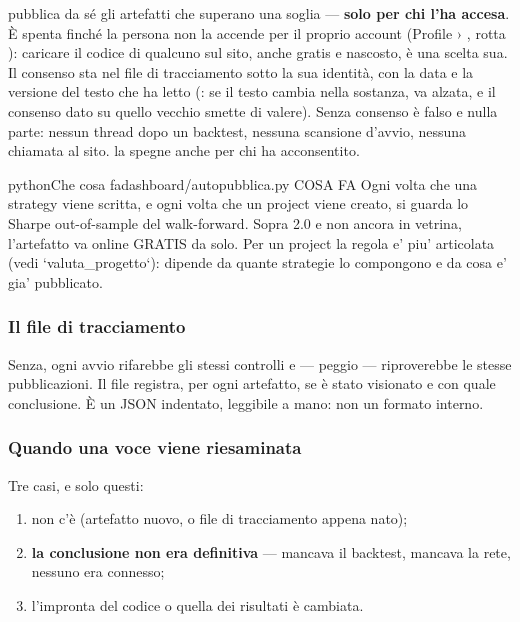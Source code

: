  pubblica da sé gli artefatti che superano
una soglia --- \textbf{solo per chi l'ha accesa}. È spenta finché la persona
non la accende per il proprio account (Profile › , rotta ): caricare il
codice di qualcuno sul sito, anche gratis e nascosto, è una scelta sua. Il
consenso sta nel file di tracciamento sotto la sua identità, con la data e la
versione del testo che ha letto (: se il testo cambia
nella sostanza, va alzata, e il consenso dato su quello vecchio smette di
valere). Senza consenso  è falso e nulla parte:
nessun thread dopo un backtest, nessuna scansione d'avvio, nessuna chiamata
al sito.  la spegne anche per chi ha acconsentito.

\begin{codiceInterno}{python}{Che cosa fa}{dashboard/autopubblica.py}
COSA FA
Ogni volta che una strategy viene scritta, e ogni volta che un project viene
creato, si guarda lo Sharpe out-of-sample del walk-forward. Sopra 2.0 e non
ancora in vetrina, l'artefatto va online GRATIS da solo. Per un project la
regola e' piu' articolata (vedi `valuta_progetto`): dipende da quante strategie
lo compongono e da cosa e' gia' pubblicato.
\end{codiceInterno}

\subsubsection{Il file di tracciamento}

Senza, ogni avvio rifarebbe gli stessi controlli e --- peggio ---
riproverebbe le stesse pubblicazioni. Il file registra, per ogni artefatto,
se è stato visionato e con quale conclusione. È un JSON indentato, leggibile
a mano: non un formato interno.

\subsubsection{Quando una voce viene riesaminata}

Tre casi, e solo questi:

\begin{enumerate}
  \item non c'è (artefatto nuovo, o file di tracciamento appena nato);
  \item \textbf{la conclusione non era definitiva} --- mancava il backtest,
        mancava la rete, nessuno era connesso;
  \item l'impronta del codice o quella dei risultati è cambiata.
\end{enumerate}

